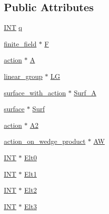 \subsection*{Public Attributes}
\begin{DoxyCompactItemize}
\item 
\mbox{\hyperlink{galois_8h_a09fddde158a3a20bd2dcadb609de11dc}{I\+NT}} \mbox{\hyperlink{classclassify__double__sixes_a95540b7415cf9334edd240ce6aee535b}{q}}
\item 
\mbox{\hyperlink{classfinite__field}{finite\+\_\+field}} $\ast$ \mbox{\hyperlink{classclassify__double__sixes_a8feff5aeef386437605ad9df15278828}{F}}
\item 
\mbox{\hyperlink{classaction}{action}} $\ast$ \mbox{\hyperlink{classclassify__double__sixes_a9a38a7f4b32b1e1061a7a78b393cb1e7}{A}}
\item 
\mbox{\hyperlink{classlinear__group}{linear\+\_\+group}} $\ast$ \mbox{\hyperlink{classclassify__double__sixes_a0861ac69fec896f50578b55c85a9294f}{LG}}
\item 
\mbox{\hyperlink{classsurface__with__action}{surface\+\_\+with\+\_\+action}} $\ast$ \mbox{\hyperlink{classclassify__double__sixes_a3a91b397cf3814de4f70171a27a1c8bc}{Surf\+\_\+A}}
\item 
\mbox{\hyperlink{classsurface}{surface}} $\ast$ \mbox{\hyperlink{classclassify__double__sixes_a8602688a94ac9f4f4337936cc937a8d0}{Surf}}
\item 
\mbox{\hyperlink{classaction}{action}} $\ast$ \mbox{\hyperlink{classclassify__double__sixes_a4ff209775c99b2d07c91adc59ef0f229}{A2}}
\item 
\mbox{\hyperlink{classaction__on__wedge__product}{action\+\_\+on\+\_\+wedge\+\_\+product}} $\ast$ \mbox{\hyperlink{classclassify__double__sixes_af6c391bcb8031fe35534a8e757502493}{AW}}
\item 
\mbox{\hyperlink{galois_8h_a09fddde158a3a20bd2dcadb609de11dc}{I\+NT}} $\ast$ \mbox{\hyperlink{classclassify__double__sixes_a98b022574ac64992f280fc27c9fb0173}{Elt0}}
\item 
\mbox{\hyperlink{galois_8h_a09fddde158a3a20bd2dcadb609de11dc}{I\+NT}} $\ast$ \mbox{\hyperlink{classclassify__double__sixes_a763fb6a0198254b3b0c6ef86515bf55b}{Elt1}}
\item 
\mbox{\hyperlink{galois_8h_a09fddde158a3a20bd2dcadb609de11dc}{I\+NT}} $\ast$ \mbox{\hyperlink{classclassify__double__sixes_a20d4881c0a82f914fa10e192e1d5654f}{Elt2}}
\item 
\mbox{\hyperlink{galois_8h_a09fddde158a3a20bd2dcadb609de11dc}{I\+NT}} $\ast$ \mbox{\hyperlink{classclassify__double__sixes_af31c76652a9527afada5c19015f50558}{Elt3}}

\end{DoxyCompactItemize}
